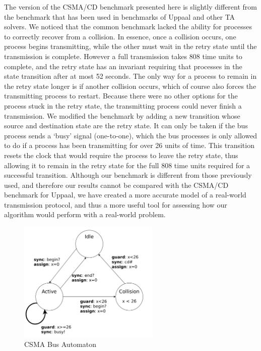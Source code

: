 \documentclass[a4paper,11pt]{report}
\theoremstyle{definition}
\begin{document}
The version of the CSMA/CD benchmark presented here is slightly
different from the benchmark that has been used in benchmarks of Uppaal and
other TA solvers. We noticed that the common benchmark lacked the ability for
processes to correctly recover from a collision. In essence, once a collision
occurs, one process begins transmitting, while the other must wait in the retry
state until the transmission is complete. However a full transmission takes 808
time units to complete, and the retry state has an invariant requiring that
processes in the state transition after at most 52 seconds. The only way for a
process to remain in the retry state longer is if another collision occurs,
which of course also forces the transmitting process to restart. Because there
were no other options for the process stuck in the retry state, the transmitting
process could never finish a transmission. We modified the benchmark by adding a
new transition whose source and destination state are the retry state. It can
only be taken if the bus process sends a `busy' signal (one-to-one), which the
bus processes is only allowed to do if a process has been transmitting for over
26 units of time. This transition resets the clock that would require the
process to leave the retry state, thus allowing it to remain in the retry state
for the full 808 time units required for a successful transition. Although our
benchmark is different from those previously used, and therefore our results
cannot be compared with the CSMA/CD benchmark for Uppaal, we have created a more
accurate model of a real-world transmission protocol, and thus a more useful
tool for assessing how our algorithm would perform with a real-world problem.

\begin{figure}[h]
  \centering
  \includegraphics[width=0.6\textwidth]{csma-bus}
  \caption{CSMA Bus Automaton}
  \label{fig:csma-bus}
\end{figure}
\end{document}
